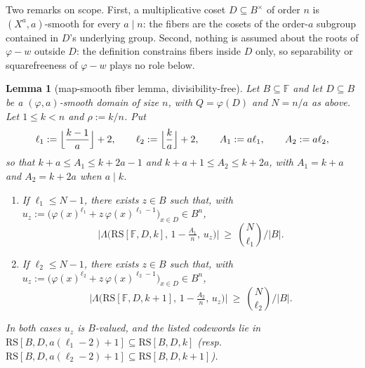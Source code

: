 \documentclass[11pt]{article}
\newtheorem{lemma}[lemma]{Lemma}
\theoremstyle{definition}
\theoremstyle{remark}
\newcommand{\F}{\mathbb{F}}
\newcommand{\B}{B}
\newcommand{\RS}{\mathrm{RS}}
\newcommand{\Lst}{\Lambda}
\begin{document}
Two remarks on scope. First, a multiplicative coset $D\subseteq\B^\times$ of order $n$ is $(X^a,a)$-smooth for every $a\mid n$: the fibers are the cosets of the order-$a$ subgroup contained in $D$'s underlying group. Second, nothing is assumed about the roots of $\varphi-w$ outside $D$: the definition constrains fibers inside $D$ only, so separability or squarefreeness of $\varphi-w$ plays no role below.

\begin{lemma}[map-smooth fiber lemma, divisibility-free]\label{lem:phi-fiber}
Let $\B\subseteq\F$ and let $D\subseteq\B$ be a $(\varphi,a)$-smooth domain of size $n$, with $Q=\varphi(D)$ and $N=n/a$ as above. Let $1\le k<n$ and $\rho:=k/n$. Put
\[
\ell_1:=\Bigl\lfloor\frac{k-1}a\Bigr\rfloor+2,\qquad
\ell_2:=\Bigl\lfloor\frac{k}a\Bigr\rfloor+2,\qquad
A_1:=a\ell_1,\qquad A_2:=a\ell_2,
\]
so that $k+a\le A_1\le k+2a-1$ and $k+a+1\le A_2\le k+2a$, with $A_1=k+a$ and $A_2=k+2a$ when $a\mid k$.
\begin{enumerate}[label=\textup{(\roman*)}]
\item If $\ell_1\le N-1$, there exists $z\in\B$ such that, with $u_z:=\bigl(\varphi(x)^{\ell_1}+z\,\varphi(x)^{\ell_1-1}\bigr)_{x\in D}\in\B^n$,
\[
\bigl|\Lst\bigl(\RS[\F,D,k],\,1-\tfrac{A_1}n,\,u_z\bigr)\bigr|\ \ge\ \binom N{\ell_1}\Big/|\B| .
\]
\item If $\ell_2\le N-1$, there exists $z\in\B$ such that, with $u_z:=\bigl(\varphi(x)^{\ell_2}+z\,\varphi(x)^{\ell_2-1}\bigr)_{x\in D}\in\B^n$,
\[
\bigl|\Lst\bigl(\RS[\F,D,k+1],\,1-\tfrac{A_2}n,\,u_z\bigr)\bigr|\ \ge\ \binom N{\ell_2}\Big/|\B| .
\]
\end{enumerate}
In both cases $u_z$ is $\B$-valued, and the listed codewords lie in $\RS[\B,D,a(\ell_1-2)+1]\subseteq\RS[\B,D,k]$ \textup(resp.\ $\RS[\B,D,a(\ell_2-2)+1]\subseteq\RS[\B,D,k+1]$\textup).
\end{lemma}
\end{document}
